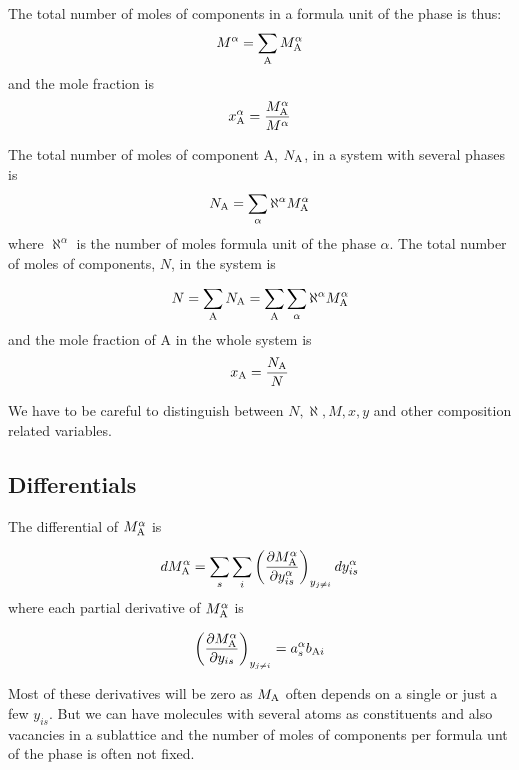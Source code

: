 \documentclass[12pt]{article}
\begin{document}
The total number of moles of components in a formula unit of the phase
is thus:
\begin{equation}
M^{\alpha} = \sum_{\rm A} M_{\rm A}^{\alpha} \label{eq:molesperfu}
\end{equation}
and the mole fraction is
\begin{equation}
x^{\alpha}_{\rm A} = \frac{M_{\rm A}^{\alpha}}{M^{\alpha}}
\end{equation}

The total number of moles of component A, $N_{\rm A}$, in a system
with several phases is
\begin{equation}
N_{\rm A} = \sum_{\alpha} \aleph^{\alpha} M_{\rm A}^{\alpha} \label{eq:mtot}
\end{equation}
where $\aleph^{\alpha}$ is the number of moles formula unit of the
phase $\alpha$.  The total number of moles of components, $N$, in the
system is

\begin{equation}
N = \sum_{\rm A} N_{\rm A} =
\sum_{\rm A} \sum_{\alpha} \aleph^{\alpha} M_{\rm A}^{\alpha}
\end{equation}
and the mole fraction of A in the whole system is
\begin{equation}
x_{\rm A} = \frac{N_{\rm A}}{N}
\end{equation}

We have to be careful to distinguish between $N, \aleph, M, x, y$ and
other composition related variables.

\subsection{Differentials}

The differential of $M^{\alpha}_{\rm A}$ is

\begin{equation}
dM^{\alpha}_{\rm A} = \sum_s \sum_i
\left(\frac{\partial M_{\rm A}^{\alpha}}{\partial y_{is}^{\alpha}}
\right)_{y_{j\ne i}} dy_{is}^{\alpha} \label{eq:diffm1}
\end{equation}
where each partial derivative of $M^{\alpha}_{\rm A}$ is

\begin{equation}
\left(\frac{\partial M_{\rm A}^{\alpha}}{\partial y_{is}}
\right)_{y_{j\ne i}} = a_s^{\alpha} b_{{\rm A}i}
\end{equation}

Most of these derivatives will be zero as $M_{\rm A}$ often depends on
a single or just a few $y_{is}$.  But we can have molecules with
several atoms as constituents and also vacancies in a sublattice and
the number of moles of components per formula unt of the phase is
often not fixed.
\end{document}
